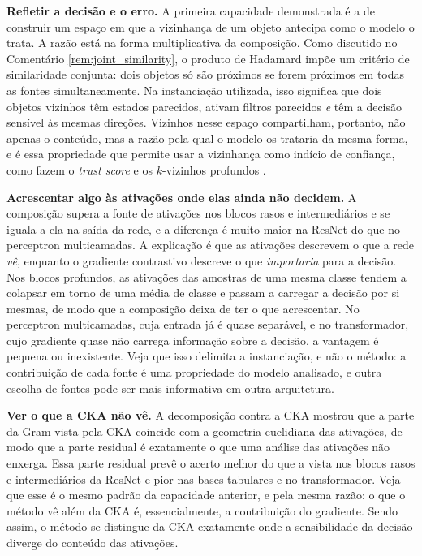 \textbf{Refletir a decisão e o erro.} A primeira capacidade demonstrada é a de construir um espaço em que a vizinhança de um objeto antecipa como o modelo o trata. A razão está na forma multiplicativa da composição. Como discutido no Comentário \ref{rem:joint_similarity}, o produto de Hadamard impõe um critério de similaridade conjunta: dois objetos só são próximos se forem próximos em todas as fontes simultaneamente. Na instanciação utilizada, isso significa que dois objetos vizinhos têm estados parecidos, ativam filtros parecidos \textit{e} têm a decisão sensível às mesmas direções. Vizinhos nesse espaço compartilham, portanto, não apenas o conteúdo, mas a razão pela qual o modelo os trataria da mesma forma, e é essa propriedade que permite usar a vizinhança como indício de confiança, como fazem o \textit{trust score} e os $k$-vizinhos profundos \citep{Jiang2018, Papernot2018}.

\textbf{Acrescentar algo às ativações onde elas ainda não decidem.} A composição supera a fonte de ativações nos blocos rasos e intermediários e se iguala a ela na saída da rede, e a diferença é muito maior na ResNet do que no perceptron multicamadas. A explicação é que as ativações descrevem o que a rede \textit{vê}, enquanto o gradiente contrastivo descreve o que \textit{importaria} para a decisão. Nos blocos profundos, as ativações das amostras de uma mesma classe tendem a colapsar em torno de uma média de classe \citep{Papyan2020} e passam a carregar a decisão por si mesmas, de modo que a composição deixa de ter o que acrescentar. No perceptron multicamadas, cuja entrada já é quase separável, e no transformador, cujo gradiente quase não carrega informação sobre a decisão, a vantagem é pequena ou inexistente. Veja que isso delimita a instanciação, e não o método: a contribuição de cada fonte é uma propriedade do modelo analisado, e outra escolha de fontes pode ser mais informativa em outra arquitetura.

\textbf{Ver o que a CKA não vê.} A decomposição contra a CKA mostrou que a parte da Gram vista pela CKA coincide com a geometria euclidiana das ativações, de modo que a parte residual é exatamente o que uma análise das ativações não enxerga. Essa parte residual prevê o acerto melhor do que a vista nos blocos rasos e intermediários da ResNet e pior nas bases tabulares e no transformador. Veja que esse é o mesmo padrão da capacidade anterior, e pela mesma razão: o que o método vê além da CKA é, essencialmente, a contribuição do gradiente. Sendo assim, o método se distingue da CKA exatamente onde a sensibilidade da decisão diverge do conteúdo das ativações.

